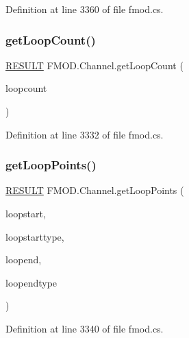 Definition at line 3360 of file fmod.\+cs.

\mbox{\label{class_f_m_o_d_1_1_channel_a1425a8a1ebcb30e16247b1bb3f52817f}} 
\subsubsection{\texorpdfstring{get\+Loop\+Count()}{getLoopCount()}}
{\footnotesize\ttfamily \hyperlink{namespace_f_m_o_d_a305d1176ef3f8c8815861a60407ac33d}{R\+E\+S\+U\+LT} F\+M\+O\+D.\+Channel.\+get\+Loop\+Count (\begin{DoxyParamCaption}\item[{out int}]{loopcount }\end{DoxyParamCaption})}



Definition at line 3332 of file fmod.\+cs.

\mbox{\label{class_f_m_o_d_1_1_channel_a837e94996edef239d52962943e65cecf}} 
\subsubsection{\texorpdfstring{get\+Loop\+Points()}{getLoopPoints()}}
{\footnotesize\ttfamily \hyperlink{namespace_f_m_o_d_a305d1176ef3f8c8815861a60407ac33d}{R\+E\+S\+U\+LT} F\+M\+O\+D.\+Channel.\+get\+Loop\+Points (\begin{DoxyParamCaption}\item[{out uint}]{loopstart,  }\item[{\hyperlink{namespace_f_m_o_d_aff20975332f93ff2180d2681cb43929f}{T\+I\+M\+E\+U\+N\+IT}}]{loopstarttype,  }\item[{out uint}]{loopend,  }\item[{\hyperlink{namespace_f_m_o_d_aff20975332f93ff2180d2681cb43929f}{T\+I\+M\+E\+U\+N\+IT}}]{loopendtype }\end{DoxyParamCaption})}



Definition at line 3340 of file fmod.\+cs.

